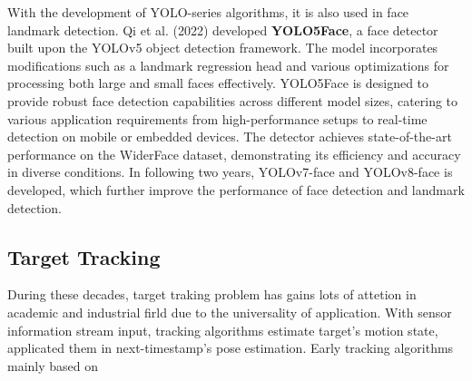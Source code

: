 With the development of YOLO-series algorithms, it is also used in face landmark detection. Qi et al. (2022) developed \textbf{YOLO5Face}\cite{Qi2022YOLO5Face}, a face detector built upon the YOLOv5 object detection framework. The model incorporates modifications such as a landmark regression head and various optimizations for processing both large and small faces effectively. YOLO5Face is designed to provide robust face detection capabilities across different model sizes, catering to various application requirements from high-performance setups to real-time detection on mobile or embedded devices. The detector achieves state-of-the-art performance on the WiderFace dataset, demonstrating its efficiency and accuracy in diverse conditions. In following two years, YOLOv7-face\cite{YOLOv7Face} and YOLOv8-face\cite{YOLOv8Face} is developed, which further improve the performance of face detection and landmark detection.

\subsection{Target Tracking}
During these decades, target traking problem has gains lots of attetion in academic and industrial firld due to the universality of application. With sensor information stream input, tracking algorithms estimate target's motion state, applicated them in next-timestamp's pose estimation. Early tracking algorithms mainly based on 



\nocite{Khabarlak_2022}

